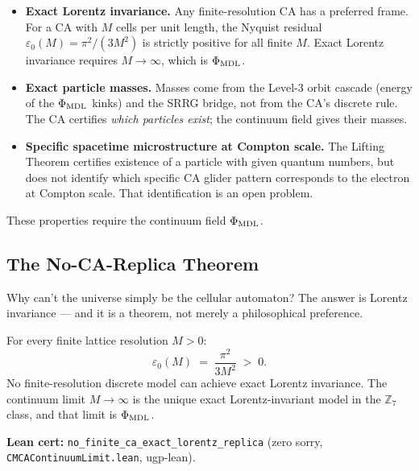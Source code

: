 \documentclass[11pt,a4paper]{article}
\newcommand{\lean}[1]{\texttt{#1}}
\newcommand{\PhiMDL}{\Phi_{\rm MDL}}
\newcommand{\ZS}{\mathbb{Z}_7}
\newcommand{\CatAL}{\textsc{CatAL}}
\begin{document}
\begin{tcolorbox}[colback=boxteal,colframe=teal!50!black,
  title=What Level~1 cannot certify (directly)]
\begin{itemize}[itemsep=4pt]
  \item \textbf{Exact Lorentz invariance.}
    Any finite-resolution CA has a preferred frame.
    For a CA with $M$ cells per unit length, the Nyquist residual
    $\varepsilon_0(M) = \pi^2/(3M^2)$ is strictly positive for all finite $M$.
    Exact Lorentz invariance requires $M \to \infty$, which is $\PhiMDL$.

  \item \textbf{Exact particle masses.}
    Masses come from the Level-3 orbit cascade (energy of the $\PhiMDL$ kinks)
    and the SRRG bridge, not from the CA's discrete rule.
    The CA certifies \emph{which particles exist}; the continuum field gives
    their masses.

  \item \textbf{Specific spacetime microstructure at Compton scale.}
    The Lifting Theorem certifies existence of a particle with given quantum
    numbers, but does not identify which specific CA glider pattern
    corresponds to the electron at Compton scale.
    That identification is an open problem.
\end{itemize}
These properties require the continuum field $\PhiMDL$.
\end{tcolorbox}

\subsection{The No-CA-Replica Theorem}
\label{sec:noca}

Why can't the universe simply be the cellular automaton?
The answer is Lorentz invariance --- and it is a theorem, not merely a
philosophical preference.

\begin{tcolorbox}[colback=boxred,colframe=red!50!black,
  title={Theorem: No-CA-Replica (\CatAL, zero sorry)}]
For every finite lattice resolution $M > 0$:
\[
  \varepsilon_0(M) \;=\; \frac{\pi^2}{3M^2} \;>\; 0.
\]
No finite-resolution discrete model can achieve exact Lorentz invariance.
The continuum limit $M \to \infty$ is the unique exact Lorentz-invariant
model in the $\ZS$ class, and that limit is $\PhiMDL$.

\smallskip\noindent
\textbf{Lean cert:} \lean{no\_finite\_ca\_exact\_lorentz\_replica}
(zero sorry, \lean{CMCAContinuumLimit.lean}, ugp-lean).
\end{tcolorbox}
\end{document}
